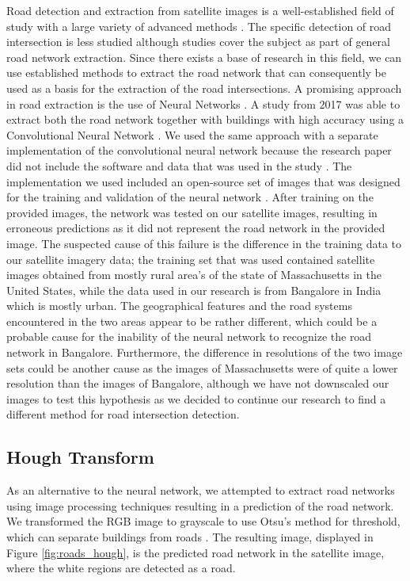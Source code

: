 Road detection and extraction from satellite images is a well-established field of study with a large variety of advanced methods \cite{mena2003state}.  The specific detection of road intersection is less studied although studies cover the subject \cite{hu2007road} \cite{koutaki2004automatic} as part of general road network extraction. Since there exists a base of research in this field, we can use established methods to extract the road network that can consequently be used as a basis for the extraction of the road intersections. 
A promising approach in road extraction is the use of Neural Networks \cite{mangala2011extraction} \cite{mokhtarzade2007road}. A study from 2017 was able to extract both the road network together with buildings with high accuracy using a Convolutional Neural Network \cite{alshehhi2017simultaneous}. We used the same approach with a separate implementation of the convolutional neural network because the research paper did not include the software and data that was used in the study \cite{airs}. The implementation we used included an open-source set of images that was designed for the training and validation of the neural network \cite{MnihThesis}. After training on the provided images, the network was tested on our satellite images, resulting in erroneous predictions as it did not represent the road network in the provided image. The suspected cause of this failure is the difference in the training data to our satellite imagery data; the training set that was used contained satellite images obtained from mostly rural area's of the state of Massachusetts in the United States, while the data used in our research is from Bangalore in India which is mostly urban. The geographical features and the road systems encountered in the two areas appear to be rather different, which could be a probable cause for the inability of the neural network to recognize the road network in Bangalore. Furthermore, the difference in resolutions of the two image sets could be another cause as the images of Massachusetts were of quite a lower resolution than the images of Bangalore, although we have not downscaled our images to test this hypothesis as we decided to continue our research to find a different method for road intersection detection.

\subsection{Hough Transform}
As an alternative to the neural network, we attempted to extract road networks using image processing techniques resulting in a prediction of the road network. We transformed the RGB image to grayscale to use Otsu's method for threshold, which can separate buildings from roads \cite{otsu1979threshold}. The resulting image, displayed in Figure \ref{fig:roads_hough}, is the predicted road network in the satellite image, where the white regions are detected as a road. 

